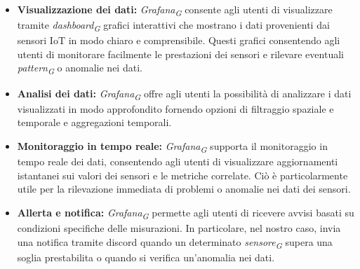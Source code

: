 \begin{itemize}
  \item \textbf{Visualizzazione dei dati:} \textit{Grafana}\textsubscript{\textit{G}} consente agli utenti di visualizzare tramite \textit{dashboard}\textsubscript{\textit{G}} grafici interattivi che mostrano i dati provenienti dai sensori IoT in modo chiaro e comprensibile. Questi grafici consentendo agli utenti di monitorare facilmente le prestazioni dei sensori e rilevare eventuali \textit{pattern}\textsubscript{\textit{G}} o anomalie nei dati.
  
  \item \textbf{Analisi dei dati:} \textit{Grafana}\textsubscript{\textit{G}} offre agli utenti la possibilità di analizzare i dati visualizzati in modo approfondito fornendo opzioni di filtraggio spaziale e temporale e aggregazioni temporali.
  
  \item \textbf{Monitoraggio in tempo reale:} \textit{Grafana}\textsubscript{\textit{G}} supporta il monitoraggio in tempo reale dei dati, consentendo agli utenti di visualizzare aggiornamenti istantanei sui valori dei sensori e le metriche correlate. Ciò è particolarmente utile per la rilevazione immediata di problemi o anomalie nei dati dei sensori.
  
  \item \textbf{Allerta e notifica:} \textit{Grafana}\textsubscript{\textit{G}} permette agli utenti di ricevere avvisi basati su condizioni specifiche delle misurazioni. In particolare, nel nostro caso, invia una notifica tramite discord quando un determinato \textit{sensore}\textsubscript{\textit{G}} supera una soglia prestabilita o quando si verifica un'anomalia nei dati.
\end{itemize} 